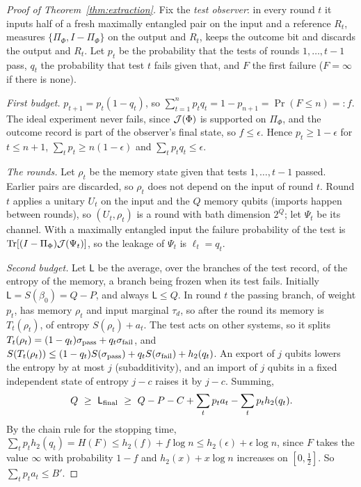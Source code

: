 \begin{proof}[Proof of Theorem~\ref{thm:extraction}]
Fix the \emph{test observer}: in every round $t$ it inputs half of a fresh maximally entangled pair on the input and a reference $R_t$, measures
$\{\Pi_\Phi,I-\Pi_\Phi\}$ on the output and $R_t$, keeps the outcome bit and discards the output and $R_t$. Let $p_t$ be the probability that the tests of
rounds $1,\dots,t-1$ pass, $q_t$ the probability that test $t$ fails given that, and $F$ the first failure ($F=\infty$ if there is none).

\emph{First budget.} $p_{t+1}=p_t(1-q_t)$, so $\sum_{t=1}^np_tq_t=1-p_{n+1}=\Pr(F\le n)=:f$. The ideal experiment never fails, since $\mathcal J(\Phi)$ is
supported on $\Pi_\Phi$, and the outcome record is part of the observer's final state, so $f\le\epsilon$. Hence $p_t\ge1-\epsilon$ for $t\le n+1$,
$\sum_tp_t\ge n(1-\epsilon)$ and $\sum_tp_tq_t\le\epsilon$.

\emph{The rounds.} Let $\rho_t$ be the memory state given that tests $1,\dots,t-1$ passed. Earlier pairs are discarded, so $\rho_t$ does not depend on the
input of round $t$. Round $t$ applies a unitary $U_t$ on the input and the $Q$ memory qubits (imports happen between rounds), so $(U_t,\rho_t)$ is a round
with bath dimension $2^Q$; let $\Psi_t$ be its channel. With a maximally entangled input the failure probability of the test is
$\operatorname{Tr}[(I-\Pi_\Phi)\mathcal J(\Psi_t)]$, so the leakage of $\Psi_t$ is $\ell_t=q_t$.

\emph{Second budget.} Let $\mathsf L$ be the average, over the branches of the test record, of the entropy of the memory, a branch being frozen when its
test fails. Initially $\mathsf L=S(\beta_0)=Q-P$, and always $\mathsf L\le Q$. In round $t$ the passing branch, of weight $p_t$, has memory $\rho_t$ and input
marginal $\tau_d$, so after the round its memory is $T_t(\rho_t)$, of entropy $S(\rho_t)+a_t$. The test acts on other systems, so it splits
$T_t(\rho_t)=(1-q_t)\sigma_{\rm pass}+q_t\sigma_{\rm fail}$, and $S(T_t(\rho_t))\le(1-q_t)S(\sigma_{\rm pass})+q_tS(\sigma_{\rm fail})+h_2(q_t)$. An export of $j$
qubits lowers the entropy by at most $j$ (subadditivity), and an import of $j$ qubits in a fixed independent state of entropy $j-c$ raises it by $j-c$. Summing,
\[
Q\ \ge\ \mathsf L_{\rm final}\ \ge\ Q-P-C+\sum_tp_ta_t-\sum_tp_th_2(q_t).
\]
By the chain rule for the stopping time, $\sum_tp_th_2(q_t)=H(F)\le h_2(f)+f\log n\le h_2(\epsilon)+\epsilon\log n$, since $F$ takes the value $\infty$ with
probability $1-f$ and $h_2(x)+x\log n$ increases on $[0,\frac12]$. So $\sum_tp_ta_t\le B'$.


\end{proof}
